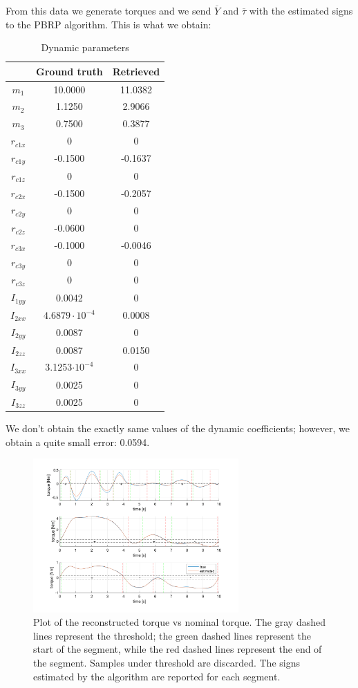 \documentclass{article}
\begin{document}
From this data we generate torques and we send $\overline{Y}$ and $\overline{\tau}$ with the estimated signs to the PBRP algorithm. This is what we obtain:

\begin{table}[!htbp]
\centering
\begin{tabular}{|c|cc|}
\hline
& Ground truth & Retrieved\\ 
\hline
$m_1$ & 10.0000 & 11.0382\\
$m_2$ & 1.1250 & 2.9066\\
$m_3$ & 0.7500 & 0.3877\\
$r_{c1x}$ &  0 & 0\\
$r_{c1y}$ & -0.1500 & -0.1637\\
$r_{c1z}$ & 0 & 0\\
$r_{c2x}$ & -0.1500 & -0.2057\\
$r_{c2y}$ & 0 & 0\\
$r_{c2z}$ & -0.0600 & 0\\
$r_{c3x}$ & -0.1000 & -0.0046\\
$r_{c3y}$ & 0 & 0\\
$r_{c3z}$ & 0 & 0\\
$I_{1yy}$ & 0.0042 & 0\\
$I_{2xx}$ & $4.6879\cdot 10^{-4}$ & 0.0008\\
$I_{2yy}$ & 0.0087 & 0\\
$I_{2zz}$ & 0.0087 & 0.0150\\
$I_{3xx}$ & 3.1253$\cdot 10^{-4}$ & 0\\
$I_{3yy}$ & 0.0025 & 0\\
$I_{3zz}$ & 0.0025 & 0\\
\hline
\end{tabular}
\caption{Dynamic parameters}
\end{table}
\FloatBarrier

We don't obtain the exactly same values of the dynamic coefficients; however, we obtain a quite small error: 0.0594.

\begin{figure}[!htbp]
\centering
\includegraphics[width=0.7\textwidth]{images/3-dof/results1.png}
\caption{Plot of the reconstructed torque vs nominal torque. The gray dashed lines represent the threshold; the green dashed lines represent the start of the segment, while the red dashed lines represent the end of the segment. Samples under threshold are discarded. The signs estimated by the algorithm are reported for each segment.}
\end{figure}
\FloatBarrier
\end{document}
